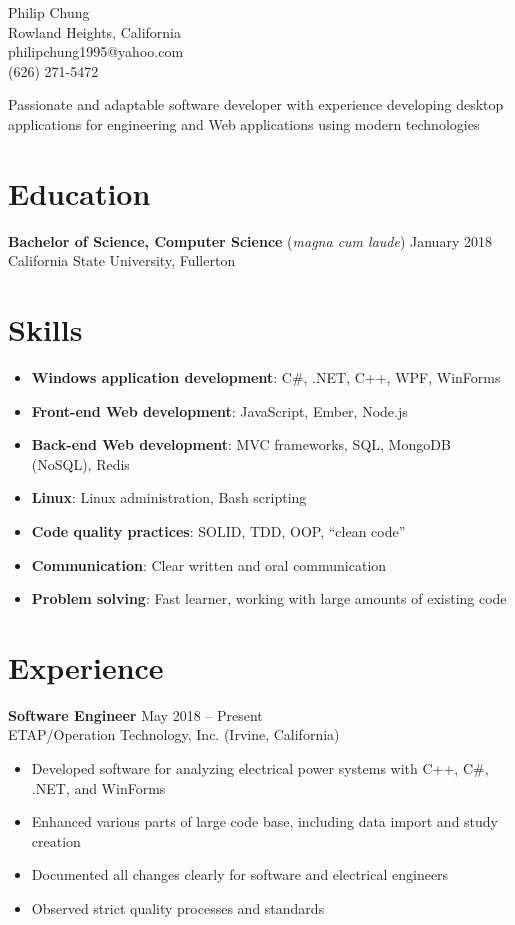 \documentclass[10pt]{article}
\newcommand{\baseheader}[3]{#1 \hfill #2 \\ #3}
\newcommand{\locheader}[4]{\baseheader{\textbf{#1}}{#2}{#3 (#4)}}
\begin{document}
	\begin{center}
		{\LARGE Philip Chung} \\
		Rowland Heights, California \\
		philipchung1995@yahoo.com \\
		(626) 271-5472 \\
	\end{center}

	Passionate and adaptable software developer with experience developing desktop applications for engineering and Web applications using modern technologies

	\section*{Education}

	\baseheader{\textbf{Bachelor of Science, Computer Science} (\textit{magna cum laude})}{January 2018}{California State University, Fullerton}

	\section*{Skills}

	\newcommand{\skillitem}[2]{\item \textbf{#1}: #2}

	\begin{itemize}
		\skillitem{Windows application development}{C\#, .NET, C++, WPF, WinForms}
		\skillitem{Front-end Web development}{JavaScript, Ember, Node.js}
		\skillitem{Back-end Web development}{MVC frameworks, SQL, MongoDB (NoSQL), Redis}
		\skillitem{Linux}{Linux administration, Bash scripting}
		\skillitem{Code quality practices}{SOLID, TDD, OOP, ``clean code''}
		\skillitem{Communication}{Clear written and oral communication}
		\skillitem{Problem solving}{Fast learner, working with large amounts of existing code}
	\end{itemize}

	\section*{Experience}

	\locheader{Software Engineer}{May 2018 -- Present}{ETAP/Operation Technology, Inc.}{Irvine, California}

	\begin{itemize}
		\item Developed software for analyzing electrical power systems with C++, C\#, .NET, and WinForms
		\item Enhanced various parts of large code base, including data import and study creation
		\item Documented all changes clearly for software and electrical engineers
		\item Observed strict quality processes and standards
	\end{itemize}
\end{document}
